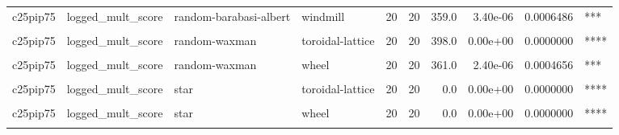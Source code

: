 \documentclass[
]{book}
\begin{document}
\begin{table}
\begin{tabular}{l|l|l|l|r|r|r|r|r|l}
\hline
\cellcolor{gray!6}{c25pip75} & \cellcolor{gray!6}{logged\_mult\_score} & \cellcolor{gray!6}{random-barabasi-albert} & \cellcolor{gray!6}{wheel} & \cellcolor{gray!6}{20} & \cellcolor{gray!6}{20} & \cellcolor{gray!6}{355.0} & \cellcolor{gray!6}{6.90e-06} & \cellcolor{gray!6}{0.0012507} & \cellcolor{gray!6}{**}\\
\hline
c25pip75 & logged\_mult\_score & random-barabasi-albert & windmill & 20 & 20 & 359.0 & 3.40e-06 & 0.0006486 & ***\\
\hline
\cellcolor{gray!6}{c25pip75} & \cellcolor{gray!6}{logged\_mult\_score} & \cellcolor{gray!6}{random-waxman} & \cellcolor{gray!6}{star} & \cellcolor{gray!6}{20} & \cellcolor{gray!6}{20} & \cellcolor{gray!6}{400.0} & \cellcolor{gray!6}{0.00e+00} & \cellcolor{gray!6}{0.0000000} & \cellcolor{gray!6}{****}\\
\hline
c25pip75 & logged\_mult\_score & random-waxman & toroidal-lattice & 20 & 20 & 398.0 & 0.00e+00 & 0.0000000 & ****\\
\hline
\cellcolor{gray!6}{c25pip75} & \cellcolor{gray!6}{logged\_mult\_score} & \cellcolor{gray!6}{random-waxman} & \cellcolor{gray!6}{well-mixed} & \cellcolor{gray!6}{20} & \cellcolor{gray!6}{20} & \cellcolor{gray!6}{95.0} & \cellcolor{gray!6}{4.00e-03} & \cellcolor{gray!6}{0.5080000} & \cellcolor{gray!6}{ns}\\
\hline
c25pip75 & logged\_mult\_score & random-waxman & wheel & 20 & 20 & 361.0 & 2.40e-06 & 0.0004656 & ***\\
\hline
\cellcolor{gray!6}{c25pip75} & \cellcolor{gray!6}{logged\_mult\_score} & \cellcolor{gray!6}{random-waxman} & \cellcolor{gray!6}{windmill} & \cellcolor{gray!6}{20} & \cellcolor{gray!6}{20} & \cellcolor{gray!6}{368.0} & \cellcolor{gray!6}{6.00e-07} & \cellcolor{gray!6}{0.0001329} & \cellcolor{gray!6}{***}\\
\hline
c25pip75 & logged\_mult\_score & star & toroidal-lattice & 20 & 20 & 0.0 & 0.00e+00 & 0.0000000 & ****\\
\hline
\cellcolor{gray!6}{c25pip75} & \cellcolor{gray!6}{logged\_mult\_score} & \cellcolor{gray!6}{star} & \cellcolor{gray!6}{well-mixed} & \cellcolor{gray!6}{20} & \cellcolor{gray!6}{20} & \cellcolor{gray!6}{0.0} & \cellcolor{gray!6}{0.00e+00} & \cellcolor{gray!6}{0.0000000} & \cellcolor{gray!6}{****}\\
\hline
c25pip75 & logged\_mult\_score & star & wheel & 20 & 20 & 0.0 & 0.00e+00 & 0.0000000 & ****\\
\hline
\cellcolor{gray!6}{c25pip75} & \cellcolor{gray!6}{logged\_mult\_score} & \cellcolor{gray!6}{star} & \cellcolor{gray!6}{windmill} & \cellcolor{gray!6}{20} & \cellcolor{gray!6}{20} & \cellcolor{gray!6}{0.0} & \cellcolor{gray!6}{0.00e+00} & \cellcolor{gray!6}{0.0000000} & \cellcolor{gray!6}{****}\\

\end{tabular}
\end{table}
\end{document}
